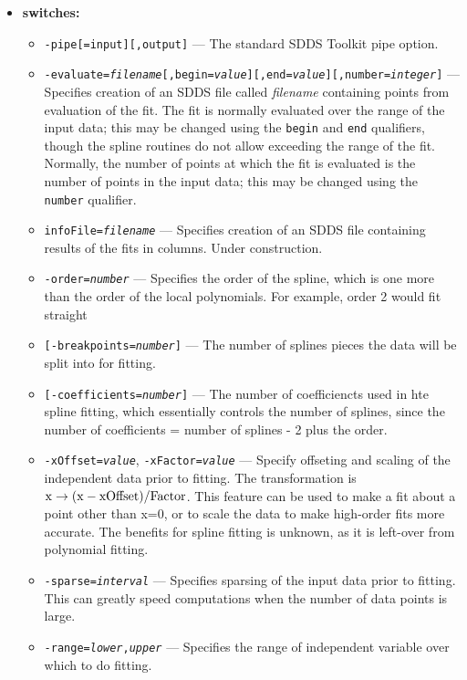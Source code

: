 \begin{itemize}
\item {\bf switches:}
    \begin{itemize}
    \item {\tt -pipe[=input][,output]} --- The standard SDDS Toolkit pipe option.
    \item {\tt -evaluate={\em filename}[,begin={\em value}][,end={\em value}][,number={\em integer}]} ---
        Specifies creation of an SDDS file called {\em filename} containing points from evaluation of the
        fit.  The fit is normally evaluated over the range of the input data; this may be changed using
        the {\tt begin} and {\tt end} qualifiers, though the spline routines do not allow exceeding the
        range of the fit. Normally, the number of points at which the fit is evaluated is the number of 
        points in the input data; this may be changed using the {\tt number} qualifier.
    \item {\tt infoFile={\em filename}} --- Specifies creation of an SDDS file containing results of
        the fits in columns. Under construction.
    \item {\tt -order={\em number}} --- Specifies the order of the spline, which is one more than the order
        of the local polynomials. For example, order 2 would fit straight 
    \item {\tt [-breakpoints={\em number}]} --- The number of splines pieces the data will be split into for fitting.
    \item {\tt [-coefficients={\em number}]} --- The number of coefficiencts used in hte spline fitting, which 
        essentially controls the number of splines, since the number of coefficients = number of splines - 2
        plus the order.
    \item {\tt -xOffset={\em value}}, {\tt -xFactor={\em value}} --- Specify offseting and scaling of the independent
        data prior to fitting.  The transformation is ${\rm x \rightarrow (x - xOffset)/Factor}$.  This feature can
        be used to make a fit about a point other than x=0, or to scale the data to make high-order fits more
        accurate. The benefits for spline fitting is unknown, as it is left-over from polynomial fitting. 
    \item {\tt -sparse={\em interval}} --- Specifies sparsing of the input data prior to fitting.  This can greatly
        speed computations when the number of data points is large.
    \item {\tt -range={\em lower},{\em upper}} --- Specifies the range of independent variable over which to do fitting.

\end{itemize}
\end{itemize}
